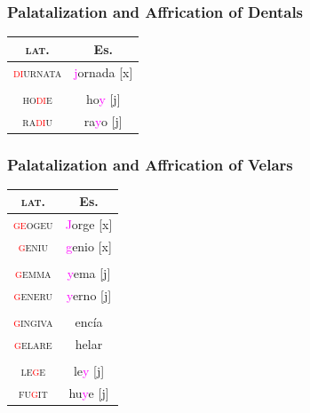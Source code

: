 \documentclass{report}[12pt]
\begin{document}
\subsubsection*{Palatalization and Affrication of Dentals}

\begin{tcolorbox}

\end{tcolorbox}

\begin{tabular}{c c}
  \textsc{lat.} & Es. \\
  \hline
  \textsc{\textcolor{red}{di}urnata} & \textcolor{magenta}{j}ornada [x] \\
                & \\
  \textsc{ho\textcolor{red}{di}e} & ho\textcolor{magenta}{y} [j] \\
  \textsc{ra\textcolor{red}{di}u} & ra\textcolor{magenta}{y}o [j] \\
\end{tabular}

\subsubsection*{Palatalization and Affrication of Velars}

\begin{tcolorbox}

\end{tcolorbox}

\begin{tabular}{c c}
  \textsc{lat.} & Es. \\
  \hline
  \textsc{\textcolor{red}{ge}ogeu} & \textcolor{magenta}{J}orge [x] \\
  \textsc{\textcolor{red}{g}eniu} & \textcolor{magenta}{g}enio [x] \\
                & \\
  \textsc{\textcolor{red}{g}emma} & \textcolor{magenta}{y}ema [j] \\
  \textsc{\textcolor{red}{g}eneru} & \textcolor{magenta}{y}erno [j] \\
                & \\
  \textsc{\textcolor{red}{g}ingiva} & encía \\
  \textsc{\textcolor{red}{g}elare} & helar \\
                & \\
  \textsc{le\textcolor{red}{g}e} & le\textcolor{magenta}{y} [j] \\
  \textsc{fu\textcolor{red}{g}it} & hu\textcolor{magenta}{y}e [j] \\
\end{tabular}
\end{document}
